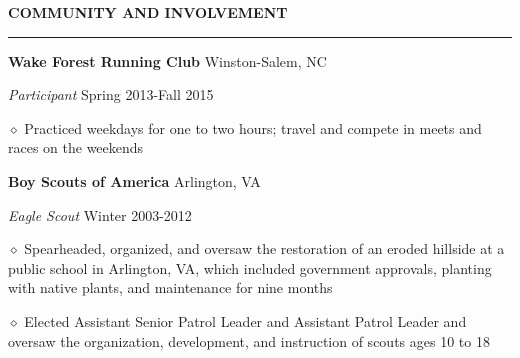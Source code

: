 \documentclass[executivepaper]{extarticle}
\begin{document}
\begin{center}
{\begin{minipage}{7.0in}
\vspace{3mm}


{\noindent \textbf{\fontsize{12}{9}\selectfont COMMUNITY AND INVOLVEMENT}}

\vspace{-3mm}

\noindent \rule{\textwidth}{0.5pt}

\vspace{0.5mm}

{\noindent \textbf{\fontsize{12}{8}\selectfont Wake Forest Running Club}} {\hfill \fontsize{10}{8}\selectfont Winston-Salem, NC}

\vspace{0.25mm}

{\noindent \textit{\fontsize{12}{8}\selectfont Participant}} {\hfill \fontsize{10}{8}\selectfont Spring 2013-Fall 2015}

\vspace{0.25mm}

{\noindent $\diamond$ {\fontsize{12}{8}\selectfont Practiced weekdays for one to two hours; travel and compete in meets and races on the weekends}}

\vspace{2mm}

{\noindent \textbf{\fontsize{12}{8}\selectfont Boy Scouts of America}} {\hfill \fontsize{10}{8}\selectfont Arlington, VA}

\vspace{0.25mm}

{\noindent \textit{\fontsize{12}{8}\selectfont Eagle Scout}} {\hfill \fontsize{10}{8}\selectfont Winter 2003-2012}

\vspace{0.25mm}

{\noindent $\diamond$ {\fontsize{12}{8}\selectfont Spearheaded, organized, and oversaw the restoration of an eroded hillside at a public school in Arlington, VA, which included government
approvals, planting with native plants, and maintenance for nine months}}

{\noindent $\diamond$ {\fontsize{12}{8}\selectfont Elected Assistant Senior Patrol Leader and Assistant Patrol Leader and oversaw the organization, development, and instruction of scouts ages 10 to 18}}

\vspace{2mm}


\end{minipage}}
\end{center}
\end{document}
